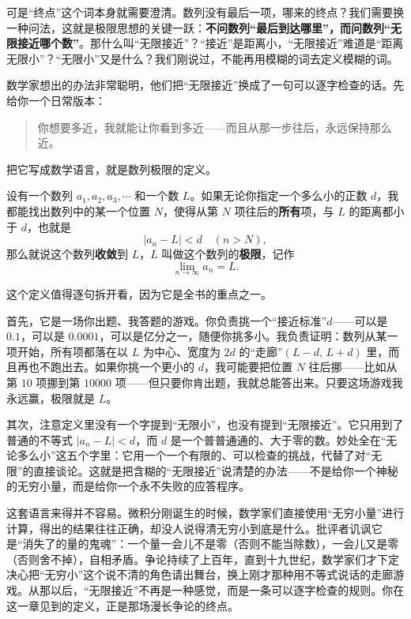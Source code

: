 可是“终点”这个词本身就需要澄清。数列没有最后一项，哪来的终点？我们需要换一种问法，这就是极限思想的关键一跃：\textbf{不问数列“最后到达哪里”，而问数列“无限接近哪个数”}。那什么叫“无限接近”？“接近”是距离小，“无限接近”难道是“距离无限小”？“无限小”又是什么？我们刚说过，不能再用模糊的词去定义模糊的词。

数学家想出的办法非常聪明，他们把“无限接近”换成了一句可以逐字检查的话。先给你一个日常版本：

\begin{quote}
你想要多近，我就能让你看到多近——而且从那一步往后，永远保持那么近。
\end{quote}

把它写成数学语言，就是数列极限的定义。

\begin{dingyi}
设有一个数列 $a_1,a_2,a_3,\cdots$ 和一个数 $L$。如果无论你指定一个多么小的正数 $d$，我都能找出数列中的某一个位置 $N$，使得从第 $N$ 项往后的\textbf{所有}项，与 $L$ 的距离都小于 $d$，也就是
\[
|a_n-L|<d \quad (n>N),
\]
那么就说这个数列\textbf{收敛}到 $L$，$L$ 叫做这个数列的\textbf{极限}，记作
\[
\lim_{n\to\infty}a_n=L.
\]
\end{dingyi}

这个定义值得逐句拆开看，因为它是全书的重点之一。

首先，它是一场你出题、我答题的游戏。你负责挑一个“接近标准”$d$——可以是 $0.1$，可以是 $0.0001$，可以是亿分之一，随便你挑多小。我负责证明：数列从某一项开始，所有项都落在以 $L$ 为中心、宽度为 $2d$ 的“走廊”$(L-d,\,L+d)$ 里，而且再也不跑出去。如果你挑一个更小的 $d$，我可能要把位置 $N$ 往后挪——比如从第 $10$ 项挪到第 $10000$ 项——但只要你肯出题，我就总能答出来。只要这场游戏我永远赢，极限就是 $L$。

其次，注意定义里没有一个字提到“无限小”，也没有提到“无限接近”。它只用到了普通的不等式 $|a_n-L|<d$，而 $d$ 是一个普普通通的、大于零的数。妙处全在“无论多么小”这五个字里：它用一个一个有限的、可以检查的挑战，代替了对“无限”的直接谈论。这就是把含糊的“无限接近”说清楚的办法——不是给你一个神秘的无穷小量，而是给你一个永不失败的应答程序。

这套语言来得并不容易。微积分刚诞生的时候，数学家们直接使用“无穷小量”进行计算，得出的结果往往正确，却没人说得清无穷小到底是什么。批评者讥讽它是“消失了的量的鬼魂”：一个量一会儿不是零（否则不能当除数），一会儿又是零（否则舍不掉），自相矛盾。争论持续了上百年，直到十九世纪，数学家们才下定决心把“无穷小”这个说不清的角色请出舞台，换上刚才那种用不等式说话的走廊游戏。从那以后，“无限接近”不再是一种感觉，而是一条可以逐字检查的规则。你在这一章见到的定义，正是那场漫长争论的终点。

